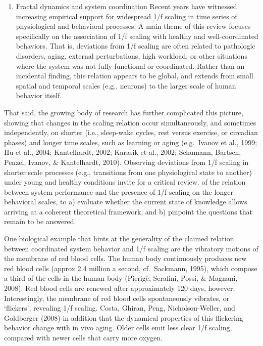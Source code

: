 \documentclass[12pt,]{book}
\providecommand{\tightlist}{%
  \setlength{\itemsep}{0pt}\setlength{\parskip}{0pt}}
\begin{document}
\begin{enumerate}
\def\labelenumi{\arabic{enumi}.}
\setcounter{enumi}{1}
\tightlist
\item
  Fractal dynamics and system coordination
  Recent years have witnessed increasing empirical support for widespread 1/f scaling in time series of physiological and behavioral processes. A main theme of this review focuses specifically on the association of 1/f scaling with healthy and well-coordinated behaviors. That is, deviations from 1/f scaling are often related to pathologic disorders, aging, external perturbations, high workload, or other situations where the system was not fully functional or coordinated. Rather than an incidental finding, this relation appears to be global, and extends from small spatial and temporal scales (e.g., neurons) to the larger scale of human behavior itself.
\end{enumerate}

That said, the growing body of research has further complicated this picture, showing that changes in the scaling relation occur simultaneously, and sometimes independently, on shorter (i.e., sleep-wake cycles, rest versus exercise, or circadian phases) and longer time scales, such as learning or aging (e.g.~Ivanov et al., 1999; Hu et al., 2004; Kantelhardt, 2002; Karasik et al., 2002; Schumann, Bartsch, Penzel, Ivanov, \& Kantelhardt, 2010). Observing deviations from 1/f scaling in shorter scale processes (e.g., transitions from one physiological state to another) under young and healthy conditions invite for a critical review. of the relation between system performance and the presence of 1/f scaling on the longer behavioral scales, to a) evaluate whether the current state of knowledge allows arriving at a coherent theoretical framework, and b) pinpoint the questions that remain to be answered.

One biological example that hints at the generality of the claimed relation between coordinated system behavior and 1/f scaling are the vibratory motions of the membrane of red blood cells. The human body continuously produces new red blood cells (approx 2.4 million a second, cf.~Sackmann, 1995), which compose a third of the cells in the human body (Pierigè, Serafini, Possi, \& Magnani, 2008). Red blood cells are renewed after approximately 120 days, however. Interestingly, the membrane of red blood cells spontaneously vibrates, or `flickers', revealing 1/f scaling. Costa, Ghiran, Peng, Nicholson-Weller, and Goldberger (2008) in addition that the dynamical properties of this flickering behavior change with in vivo aging. Older cells emit less clear 1/f scaling, compared with newer cells that carry more oxygen.
\end{document}
